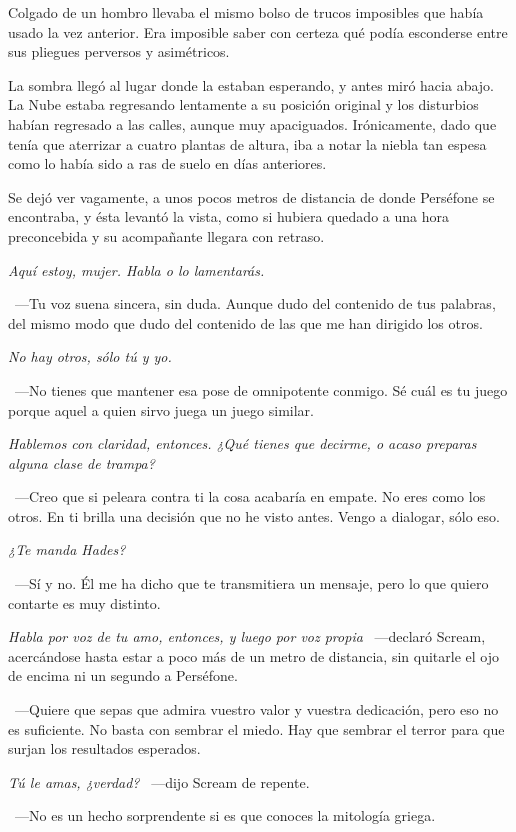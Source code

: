 Colgado de un hombro llevaba el mismo bolso de trucos imposibles que había usado la vez anterior. Era imposible saber con certeza qué podía esconderse entre sus pliegues perversos y asimétricos.

La sombra llegó al lugar donde la estaban esperando, y antes miró hacia abajo. La Nube estaba regresando lentamente a su posición original y los disturbios habían regresado a las calles, aunque muy apaciguados. Irónicamente, dado que tenía que aterrizar a cuatro plantas de altura, iba a notar la niebla tan espesa como lo había sido a ras de suelo en días anteriores.

Se dejó ver vagamente, a unos pocos metros de distancia de donde Perséfone se encontraba, y ésta levantó la vista, como si hubiera quedado a una hora preconcebida y su acompañante llegara con retraso.

\emph{Aquí estoy, mujer. Habla o lo lamentarás.}

~---Tu voz suena sincera, sin duda. Aunque dudo del contenido de tus palabras, del mismo modo que dudo del contenido de las que me han dirigido los otros.

\emph{No hay otros, sólo tú y yo.}

~---No tienes que mantener esa pose de omnipotente conmigo. Sé cuál es tu juego porque aquel a quien sirvo juega un juego similar.

\emph{Hablemos con claridad, entonces. ¿Qué tienes que decirme, o acaso preparas alguna clase de trampa?}

~---Creo que si peleara contra ti la cosa acabaría en empate. No eres como los otros. En ti brilla una decisión que no he visto antes. Vengo a dialogar, sólo eso.

\emph{¿Te manda Hades?}

~---Sí y no. Él me ha dicho que te transmitiera un mensaje, pero lo que quiero contarte es muy distinto.

\emph{Habla por voz de tu amo, entonces, y luego por voz propia} ~---declaró Scream, acercándose hasta estar a poco más de un metro de distancia, sin quitarle el ojo de encima ni un segundo a Perséfone.

~---Quiere que sepas que admira vuestro valor y vuestra dedicación, pero eso no es suficiente. No basta con sembrar el miedo. Hay que sembrar el terror para que surjan los resultados esperados.

\emph{Tú le amas, ¿verdad?} ~---dijo Scream de repente.

~---No es un hecho sorprendente si es que conoces la mitología griega.

